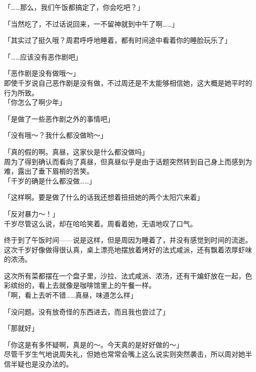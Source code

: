 「……那么，我们午饭都搞定了，你会吃吧？」

「当然吃了，不过话说回来，一不留神就到中午了啊……」

「其实过了挺久哦？周君呼呼地睡着，都有时间途中看着你的睡脸玩乐了」

「……应该没有恶作剧吧」

「恶作剧是没有做哦～」\\

即使千岁说自己恶作剧是没有做，不过周还是不太能够相信她，这大概是她平时的行为所致。\\

「你怎么了啊少年」

「是做了一些恶作剧之外的事情吧」

「没有哦～？我什么都没做哟～」

「真的假的啊。真昼，这家伙是什么都没做吗」\\

周为了得到确认而看向了真昼，但真昼似乎是由于话题突然转到自己身上而感到为难，露出了垂下眉梢的苦笑。\\

「千岁的确是什么都没做……」

「这样啊。要是做了什么的话我还想着扭扭她的两个太阳穴来着」

「反对暴力～！」\\

千岁尽管这么说，却在哈哈笑着。周看着她，无语地叹了口气。\\

\vspace{2\baselineskip}

终于到了午饭时间——说是这样，但是周因为睡着了，并没有感觉到时间的流逝。\\

这次千岁好像做得很认真，桌上漂亮地摆放着烤好的法式咸派，还有飘着浓厚虾味的浓汤。

这次所有菜都摆在一个盘子里，沙拉、法式咸派、浓汤，还有干煸虾放在一起，色彩缤纷的，看上去就像是咖啡馆里上的午餐一样。\\

「啊，看上去听不错……真昼，味道怎么样」

「没问题。没有放奇怪的东西进去，而且我也尝过了」

「那就好」

「你这是有多怀疑啊，真是的～。今天真的是好好做的～」\\

尽管千岁生气地说周失礼，但她也常常会嘴上这么说实则突然袭击，所以周对她半信半疑也是没办法的。

